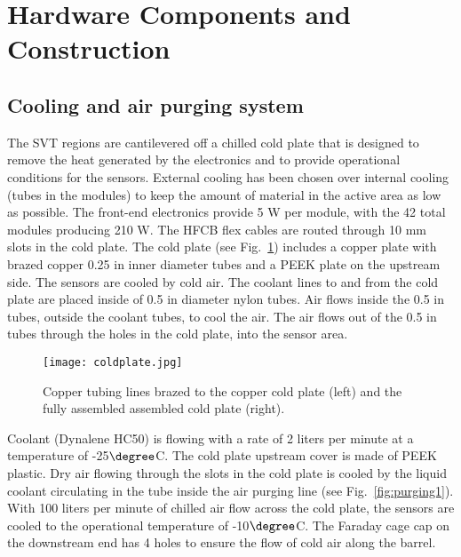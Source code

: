 \section{Hardware Components and Construction}

\subsection{Cooling and air purging system}

The SVT regions are cantilevered off a chilled cold plate that is designed to remove the heat generated by the electronics and to provide operational  conditions for the sensors. External cooling has been chosen over internal cooling (tubes in the modules) to keep the amount of material in the active area as low as possible. The front-end electronics provide 5 W per module, with the 42 total modules producing 210 W. The HFCB flex cables are routed through 10 mm slots in the cold plate. The cold plate (see Fig.~\ref{fig:coldplate}) includes a copper plate with brazed  copper 0.25 in inner diameter tubes and a PEEK plate on the upstream side. The sensors are cooled by cold air.  The coolant lines to and from the cold plate are placed inside of 0.5 in diameter nylon tubes.  Air flows inside the 0.5 in tubes, outside the coolant tubes, to cool the air.  The air flows out of the 0.5 in tubes through the holes in the cold plate, into the sensor area.

\begin{figure}[hbt] 
\centering 
\texttt{[image: coldplate.jpg]}
\caption{Copper tubing lines brazed to the copper cold plate (left) and the fully assembled assembled cold plate (right).}
\label{fig:coldplate}
\end{figure}


Coolant (Dynalene HC50) is flowing with a rate of 2 liters per minute at a temperature of -25$\degree$C. The cold plate upstream cover is made of PEEK plastic. Dry air flowing through the slots in the cold plate is cooled by the liquid coolant circulating in the tube inside the air purging line (see Fig.~\ref{fig:purging1}). With 100 liters per minute of chilled air flow across the cold plate, the sensors are cooled to the operational temperature of -10$\degree$C. The Faraday cage cap on the downstream end has 4 holes to ensure the flow of cold air along the barrel. 


